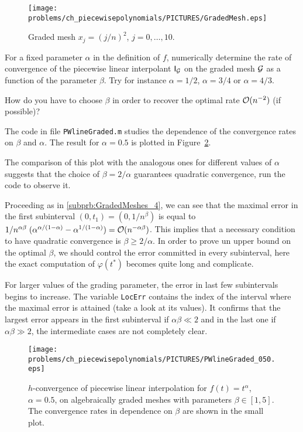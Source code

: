 \begin{problem}
\begin{subproblem}[3]
\begin{figure}[htb]\caption{Graded mesh $x_j=(j/n)^2$, $j=0,\ldots,10$.}\label{fig:GradedMesh}
\begin{center}\texttt{[image: \\problems/ch\_piecewisepolynomials/PICTURES/GradedMesh.eps]}\end{center}\end{figure}

For a fixed parameter $\alpha$ in the definition of $f$, numerically determine the rate of convergence of the piecewise linear interpolant $\mathsf{I}_{\cal G}$ on the graded mesh ${\cal G}$ as a function of the parameter $\beta$.
Try for instance $\alpha=1/2$, $\alpha=3/4$ or $\alpha=4/3$.

How do you have to choose $\beta$ in order to recover the optimal rate ${\cal O}(n^{-2})$ (if possible)?  


\begin{solution}The code in file \texttt{PWlineGraded.m} studies the dependence of the convergence rates on $\beta$ and $\alpha$.
The result for $\alpha=0.5$ is plotted in Figure~\ref{fig:PWlineGraded}.

The comparison of this plot with the analogous ones for different values of $\alpha$ suggests that the choice of $\beta=2/\alpha$ guarantees quadratic convergence, run the code to observe it.

Proceeding as in \ref{subprb:GradedMeshes_4}, we can see that the maximal error in the first subinterval $(0,t_1)=(0,1/n^\beta)$ is equal to
$1/n^{\alpha\beta} \;(\alpha^{\alpha/(1-\alpha)}-\alpha^{1/(1-\alpha)})={\cal O}(n^{-\alpha\beta})$.
This implies that a necessary condition to have quadratic convergence is $\beta\geq 2/\alpha$.
In order to prove un upper bound on the optimal $\beta$, we should control the error committed in every subinterval, here the exact computation of $\varphi(t^*)$ becomes quite long and complicate.

For larger values of the grading parameter, the error in last few subintervals begins to increase.
The variable \texttt{LocErr} contains the index of the interval where the maximal error is attained (take a look at its values).
It confirms that the largest error appears in the first subinterval if $\alpha\beta\ll 2$ and in the last one if $\alpha\beta\gg2$, the intermediate cases are not completely clear.


\begin{figure}[htb]
\caption{$h$-convergence of piecewise linear interpolation for $f(t)= t^\alpha$, $\alpha=0.5$, on algebraically graded meshes with parameters $\beta\in[1,5]$.
The convergence rates in dependence on $\beta$ are shown in the small plot.}
\label{fig:PWlineGraded}\begin{center}\texttt{[image: \\problems/ch\_piecewisepolynomials/PICTURES/PWlineGraded\_050.eps]}\end{center}\end{figure}


\end{solution}
\end{subproblem}
\end{problem}
